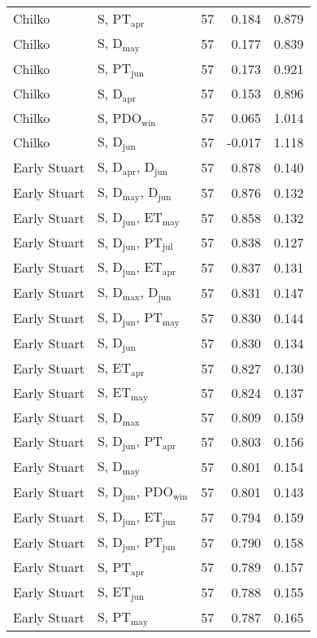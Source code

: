\begin{longtable}{llrrr}
Chilko & S, PT$_\mathrm{apr}$ & 57 & 0.184 & 0.879 \\ 
Chilko & S, D$_\mathrm{may}$ & 57 & 0.177 & 0.839 \\ 
Chilko & S, PT$_\mathrm{jun}$ & 57 & 0.173 & 0.921 \\ 
Chilko & S, D$_\mathrm{apr}$ & 57 & 0.153 & 0.896 \\ 
Chilko & S, PDO$_\mathrm{win}$ & 57 & 0.065 & 1.014 \\ 
Chilko & S, D$_\mathrm{jun}$ & 57 & -0.017 & 1.118 \\ 
Early Stuart & S, D$_\mathrm{apr}$, D$_\mathrm{jun}$ & 57 & 0.878 & 0.140 \\ 
Early Stuart & S, D$_\mathrm{may}$, D$_\mathrm{jun}$ & 57 & 0.876 & 0.132 \\ 
Early Stuart & S, D$_\mathrm{jun}$, ET$_\mathrm{may}$ & 57 & 0.858 & 0.132 \\ 
Early Stuart & S, D$_\mathrm{jun}$, PT$_\mathrm{jul}$ & 57 & 0.838 & 0.127 \\ 
Early Stuart & S, D$_\mathrm{jun}$, ET$_\mathrm{apr}$ & 57 & 0.837 & 0.131 \\ 
Early Stuart & S, D$_\mathrm{max}$, D$_\mathrm{jun}$ & 57 & 0.831 & 0.147 \\ 
Early Stuart & S, D$_\mathrm{jun}$, PT$_\mathrm{may}$ & 57 & 0.830 & 0.144 \\ 
Early Stuart & S, D$_\mathrm{jun}$ & 57 & 0.830 & 0.134 \\ 
Early Stuart & S, ET$_\mathrm{apr}$ & 57 & 0.827 & 0.130 \\ 
Early Stuart & S, ET$_\mathrm{may}$ & 57 & 0.824 & 0.137 \\ 
Early Stuart & S, D$_\mathrm{max}$ & 57 & 0.809 & 0.159 \\ 
Early Stuart & S, D$_\mathrm{jun}$, PT$_\mathrm{apr}$ & 57 & 0.803 & 0.156 \\ 
Early Stuart & S, D$_\mathrm{may}$ & 57 & 0.801 & 0.154 \\ 
Early Stuart & S, D$_\mathrm{jun}$, PDO$_\mathrm{win}$ & 57 & 0.801 & 0.143 \\ 
Early Stuart & S, D$_\mathrm{jun}$, ET$_\mathrm{jun}$ & 57 & 0.794 & 0.159 \\ 
Early Stuart & S, D$_\mathrm{jun}$, PT$_\mathrm{jun}$ & 57 & 0.790 & 0.158 \\ 
Early Stuart & S, PT$_\mathrm{apr}$ & 57 & 0.789 & 0.157 \\ 
Early Stuart & S, ET$_\mathrm{jun}$ & 57 & 0.788 & 0.155 \\ 
Early Stuart & S, PT$_\mathrm{may}$ & 57 & 0.787 & 0.165 \\ 

\end{longtable}
